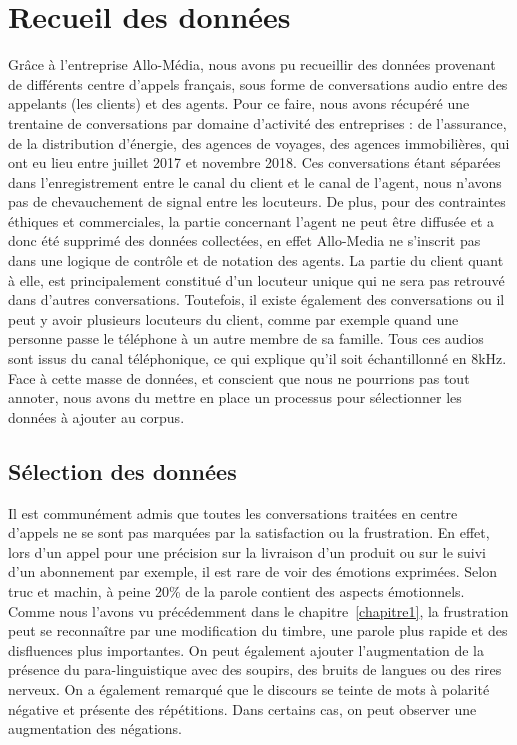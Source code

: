 \section{Recueil des données}
Grâce à l'entreprise Allo-Média, nous avons pu recueillir des données provenant de différents centre d'appels français, sous forme de conversations audio entre des appelants (les clients) et des agents.
Pour ce faire, nous avons récupéré une trentaine de conversations par domaine d'activité des entreprises : de l'assurance, de la distribution d'énergie, des agences de voyages, des agences immobilières, qui ont eu lieu entre juillet 2017 et novembre 2018. Ces conversations étant séparées dans l'enregistrement entre le canal du client et le canal de l'agent, nous n'avons pas de chevauchement de signal entre les locuteurs. De plus, pour des contraintes éthiques et commerciales, la partie concernant l'agent ne peut être diffusée et a donc été supprimé des données collectées, en effet Allo-Media ne s'inscrit pas dans une logique de contrôle et de notation des agents. La partie du client quant à elle, est principalement constitué d'un locuteur unique qui ne sera pas retrouvé dans d'autres conversations. Toutefois, il existe également des conversations ou il peut y avoir plusieurs locuteurs du client, comme par exemple quand une personne passe le téléphone à un autre membre de sa famille. Tous ces audios sont issus du canal téléphonique, ce qui explique qu'il soit échantillonné en 8kHz.
Face à cette masse de données, et conscient que nous ne pourrions pas tout annoter, nous avons du mettre en place un processus pour sélectionner les données à ajouter au corpus.

\subsection{Sélection des données}
Il est communément admis que toutes les conversations traitées en centre d'appels ne se sont pas marquées par la satisfaction ou la frustration. En effet, lors d'un appel pour une précision sur la livraison d'un produit ou sur le suivi d'un abonnement par exemple, il est rare de voir des émotions exprimées. Selon truc et machin, à peine 20\% de la parole contient des aspects émotionnels.
Comme nous l'avons vu précédemment dans le chapitre~\ref{chapitre1}, la frustration peut se reconnaître par une modification du timbre, une parole plus rapide et des disfluences plus importantes. On peut également ajouter l'augmentation de la présence du para-linguistique avec des soupirs, des bruits de langues ou des rires nerveux. On a également remarqué que le discours se teinte de mots à polarité négative et présente des répétitions. Dans certains cas, on peut observer une augmentation des négations.

